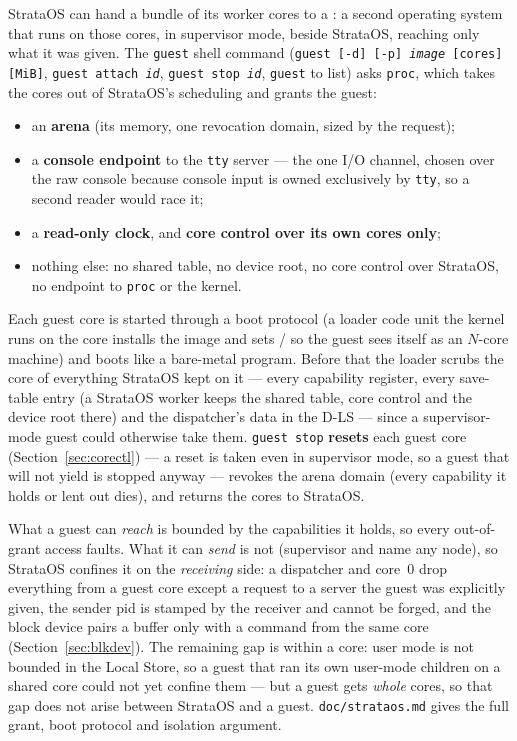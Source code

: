 StrataOS can hand a bundle of its worker cores to a : a second operating system that runs
on those cores, in supervisor mode, beside StrataOS, reaching only what it was given. The \texttt{guest}
shell command (\texttt{guest [-d] [-p] \emph{image} [cores] [MiB]}, \texttt{guest attach \emph{id}},
\texttt{guest stop \emph{id}}, \texttt{guest} to list) asks \texttt{proc}, which takes the cores out of
StrataOS's scheduling and grants the guest:

\begin{itemize}
\item an \textbf{arena} (its memory, one revocation domain, sized by the request);
\item a \textbf{console endpoint} to the \texttt{tty} server --- the one I/O channel, chosen over the raw
  console because console input is owned exclusively by \texttt{tty}, so a second reader would race it;
\item a \textbf{read-only clock}, and \textbf{core control over its own cores only};
\item nothing else: no shared table, no device root, no core control over StrataOS, no endpoint to
  \texttt{proc} or the kernel.
\end{itemize}

Each guest core is started through a boot protocol (a loader code unit the kernel runs on the core
installs the image and sets / so the guest sees itself as an $N$-core
machine) and boots like a bare-metal program. Before that the loader scrubs the core of everything
StrataOS kept on it --- every capability register, every save-table entry (a StrataOS worker keeps the
shared table, core control and the device root there) and the dispatcher's data in the D-LS --- since a
supervisor-mode guest could otherwise take them. \texttt{guest stop} \textbf{resets} each guest core
(Section~\ref{sec:corectl}) --- a reset is taken even in supervisor mode, so a guest that will not
yield is stopped anyway --- revokes the arena domain (every capability it holds or lent out dies), and
returns the cores to StrataOS.

What a guest can \emph{reach} is bounded by the capabilities it holds, so every out-of-grant access
faults. What it can \emph{send} is not (supervisor  and  name any node), so
StrataOS confines it on the \emph{receiving} side: a dispatcher and core~0 drop everything from a guest
core except a request to a server the guest was explicitly given, the sender pid is stamped by the
receiver and cannot be forged, and the block device pairs a buffer only with a command from the same
core (Section~\ref{sec:blkdev}). The remaining gap is within a core: user mode is not bounded in the
Local Store, so a guest that ran its own user-mode children on a shared core could not yet confine them
--- but a guest gets \emph{whole} cores, so that gap does not arise between StrataOS and a guest.
\texttt{doc/strataos.md} gives the full grant, boot protocol and isolation argument.

